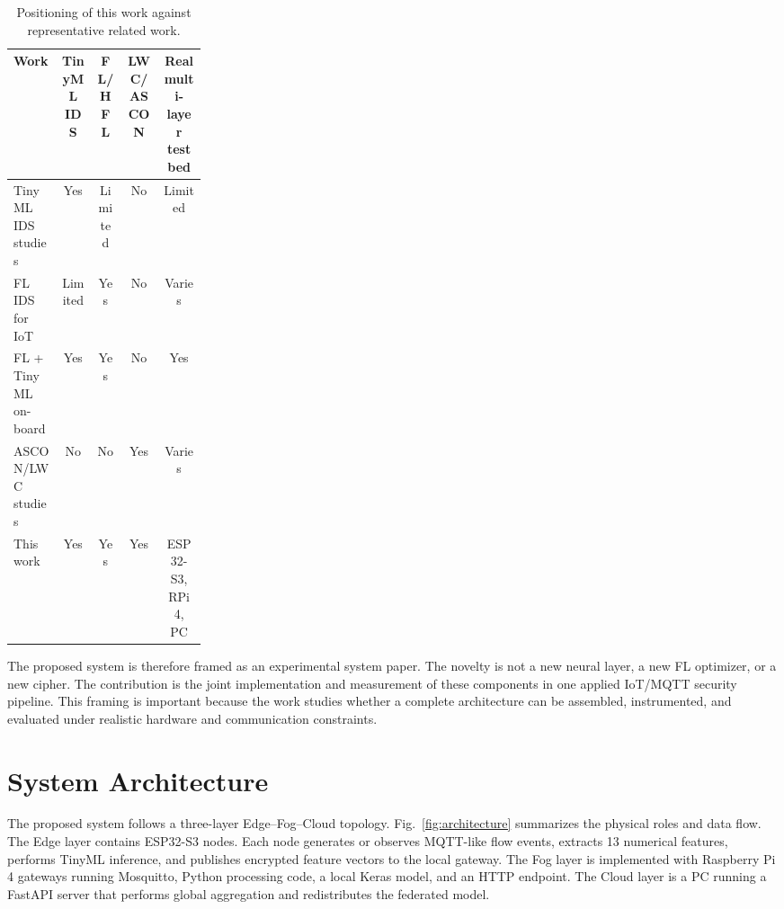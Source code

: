 \documentclass[runningheads]{llncs}
\begin{document}
\begin{table}[t]
\centering
\caption{Positioning of this work against representative related work.}
\label{tab:related_positioning}
\begin{tabular}{p{0.25\linewidth}cccc}
\toprule
Work & TinyML IDS & FL/HFL & LWC/ASCON & Real multi-layer testbed \\
\midrule
TinyML IDS studies \cite{Tekin2023_OnDeviceEnergy,Amuthadevi2025,HeydariMahmoud2025_TinyML_IDS} & Yes & Limited & No & Limited \\
FL IDS for IoT \cite{Hajj2023_CrossLayerFL_IDS,Roy2023_FL_AdaptedModel,Chaurasia2024_FL_ResNet_IIoT} & Limited & Yes & No & Varies \\
FL + TinyML on-board \cite{Ficco2024_FL_TinyML_Onboard} & Yes & Yes & No & Yes \\
ASCON/LWC studies \cite{NISTSP8002322025,Kaur2025_ASCON_Survey,Mirzaali2025_LWC_Permutations} & No & No & Yes & Varies \\
This work & Yes & Yes & Yes & ESP32-S3, RPi 4, PC \\
\bottomrule
\end{tabular}
\end{table}

The proposed system is therefore framed as an experimental system paper. The novelty is not a new neural layer, a new FL optimizer, or a new cipher. The contribution is the joint implementation and measurement of these components in one applied IoT/MQTT security pipeline. This framing is important because the work studies whether a complete architecture can be assembled, instrumented, and evaluated under realistic hardware and communication constraints.

\section{System Architecture}

The proposed system follows a three-layer Edge--Fog--Cloud topology. Fig.~\ref{fig:architecture} summarizes the physical roles and data flow. The Edge layer contains ESP32-S3 nodes. Each node generates or observes MQTT-like flow events, extracts 13 numerical features, performs TinyML inference, and publishes encrypted feature vectors to the local gateway. The Fog layer is implemented with Raspberry Pi 4 gateways running Mosquitto, Python processing code, a local Keras model, and an HTTP endpoint. The Cloud layer is a PC running a FastAPI server that performs global aggregation and redistributes the federated model.
\end{document}
